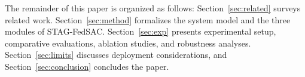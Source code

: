 The remainder of this paper is organized as follows: Section~\ref{sec:related} surveys related work. Section~\ref{sec:method} formalizes the system model and the three modules of STAG-FedSAC. Section~\ref{sec:exp} presents experimental setup, comparative evaluations, ablation studies, and robustness analyses. Section~\ref{sec:limits} discusses deployment considerations, and Section~\ref{sec:conclusion} concludes the paper.
